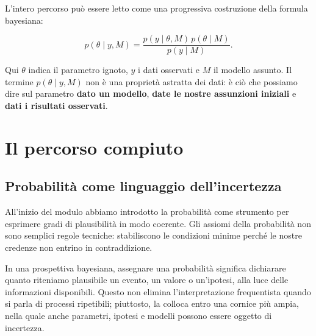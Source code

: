 \documentclass[
  italian,
  letterpaper,
  a4paper,
  11pt,
  open=any]{scrbook}
\theoremstyle{plain}
\theoremstyle{definition}
\theoremstyle{definition}
\theoremstyle{remark}
\begin{document}
\begin{tcolorbox}[enhanced jigsaw, arc=.35mm, bottomrule=.15mm, bottomtitle=1mm, breakable, colback=white, colbacktitle=quarto-callout-note-color!10!white, colframe=quarto-callout-note-color-frame, coltitle=black, left=2mm, leftrule=.75mm, opacityback=0, opacitybacktitle=0.6, rightrule=.15mm, title=\textcolor{quarto-callout-note-color}{\faInfo}\hspace{0.5em}{Il filo conduttore del modulo}, titlerule=0mm, toprule=.15mm, toptitle=1mm]

L'intero percorso può essere letto come una progressiva costruzione
della formula bayesiana:

\[
p(\theta \mid y, M) = \frac{p(y \mid \theta, M)\,p(\theta \mid M)}{p(y \mid M)}.
\]

Qui \(\theta\) indica il parametro ignoto, \(y\) i dati osservati e
\(M\) il modello assunto. Il termine \(p(\theta \mid y, M)\) non è una
proprietà astratta dei dati: è ciò che possiamo dire sul parametro
\textbf{dato un modello}, \textbf{date le nostre assunzioni iniziali} e
\textbf{dati i risultati osservati}.

\end{tcolorbox}

\section*{Il percorso compiuto}\label{il-percorso-compiuto}


\subsection*{Probabilità come linguaggio
dell'incertezza}\label{probabilituxe0-come-linguaggio-dellincertezza}

All'inizio del modulo abbiamo introdotto la probabilità come strumento
per esprimere gradi di plausibilità in modo coerente. Gli assiomi della
probabilità non sono semplici regole tecniche: stabiliscono le
condizioni minime perché le nostre credenze non entrino in
contraddizione.

In una prospettiva bayesiana, assegnare una probabilità significa
dichiarare quanto riteniamo plausibile un evento, un valore o
un'ipotesi, alla luce delle informazioni disponibili. Questo non elimina
l'interpretazione frequentista quando si parla di processi ripetibili;
piuttosto, la colloca entro una cornice più ampia, nella quale anche
parametri, ipotesi e modelli possono essere oggetto di incertezza.
\end{document}
